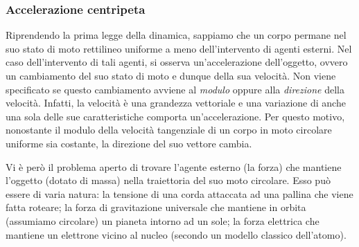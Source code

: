 \subsubsection*{Accelerazione centripeta}
Riprendendo la prima legge della dinamica, sappiamo che un corpo permane nel
suo stato di moto rettilineo uniforme a meno dell'intervento di agenti esterni.
Nel caso dell'intervento di tali agenti, si osserva un'accelerazione
dell'oggetto, ovvero un cambiamento del suo stato di moto e dunque della sua
velocità. Non viene specificato se questo cambiamento avviene al \textit{modulo}
oppure alla \textit{direzione} della velocità. Infatti, la velocità è una
grandezza vettoriale e una variazione di anche una sola delle sue caratteristiche
comporta un'accelerazione. Per questo motivo, nonostante il modulo della velocità
tangenziale di un corpo in moto circolare uniforme sia costante, la direzione
del suo vettore cambia.

Vi è però il problema aperto di trovare l'agente esterno (la forza) che
mantiene l'oggetto (dotato di massa) nella traiettoria del suo moto circolare.
Esso può essere di varia natura: la tensione di una corda attaccata ad una
pallina che viene fatta roteare; la forza di gravitazione universale che
mantiene in orbita (assumiamo circolare) un pianeta intorno ad un sole; la forza
elettrica che mantiene un elettrone vicino al nucleo (secondo un modello classico
dell'atomo).

